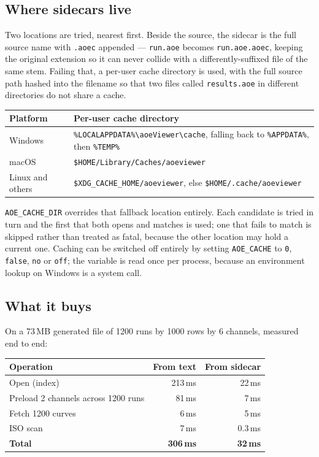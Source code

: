 \documentclass[11pt,a4paper,oneside]{report}
\newcommand{\code}[1]{\texttt{#1}}
\begin{document}
\subsection{Where sidecars live}

Two locations are tried, nearest first. Beside the source, the sidecar is the
full source name with \code{.aoec} appended --- \code{run.aoe} becomes
\code{run.aoe.aoec}, keeping the original extension so it can never collide with
a differently-suffixed file of the same stem. Failing that, a per-user cache
directory is used, with the full source path hashed into the filename so that two
files called \code{results.aoe} in different directories do not share a cache.

\begin{center}
\small
\begin{tabular}{@{}p{}p{}@{}}
\toprule
\textbf{Platform} & \textbf{Per-user cache directory} \\
\midrule
Windows & \code{\%LOCALAPPDATA\%\textbackslash aoeViewer\textbackslash cache}, falling back to \code{\%APPDATA\%}, then \code{\%TEMP\%} \\
macOS & \code{\$HOME/Library/Caches/aoeviewer} \\
Linux and others & \code{\$XDG\_CACHE\_HOME/aoeviewer}, else \code{\$HOME/.cache/aoeviewer} \\
\bottomrule
\end{tabular}
\end{center}

\code{AOE\_CACHE\_DIR} overrides that fallback location entirely. Each candidate
is tried in turn and the first that both opens and matches is used; one that
fails to match is skipped rather than treated as fatal, because the other
location may hold a current one. Caching can be switched off entirely by setting
\code{AOE\_CACHE} to \code{0}, \code{false}, \code{no} or \code{off}; the
variable is read once per process, because an environment lookup on Windows is a
system call.

\subsection{What it buys}

On a 73\,MB generated file of 1200 runs by 1000 rows by 6 channels, measured end
to end:

\begin{center}
\small
\begin{tabular}{@{}lrr@{}}
\toprule
\textbf{Operation} & \textbf{From text} & \textbf{From sidecar} \\
\midrule
Open (index) & 213\,ms & 22\,ms \\
Preload 2 channels across 1200 runs & 81\,ms & 7\,ms \\
Fetch 1200 curves & 6\,ms & 5\,ms \\
ISO scan & 7\,ms & 0.3\,ms \\
\midrule
\textbf{Total} & \textbf{306\,ms} & \textbf{32\,ms} \\
\bottomrule
\end{tabular}
\end{center}
\end{document}
